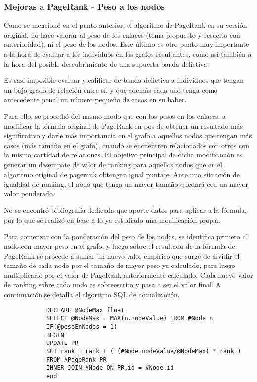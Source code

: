 \subsubsection{Mejoras a PageRank - Peso a los nodos}

Como se mencionó en el punto anterior, el algoritmo de PageRank en su versión original, no hace valorar al peso de los enlaces (tema propuesto y resuelto con anterioridad), ni el peso de los nodos. Este último es otro punto muy importante a la hora de evaluar a los individuos en los grafos resultantes, como así también a la hora del posible descubrimiento de una supuesta banda delictiva.

Es casi imposible evaluar y calificar de banda delictiva a individuos que tengan un bajo grado de relación entre sí, y que además cada uno tenga como antecedente penal un número pequeño de casos en su haber.

Para ello, se procedió del mismo modo que con los pesos en los enlaces, a modificar la fórmula original de PageRank en pos de obtener un resultado más significativo y darle más importancia en el grafo a aquellos nodos que tengan más casos (más tamaño en el grafo), cuando se encuentren relacionados con otros con la misma cantidad de relaciones. El objetivo principal de dicha modificación es generar un desempate de valor de ranking para aquellos nodos que en el algoritmo original de pagerank obtengan igual puntaje. Ante una situación de igualdad de ranking, el nodo que tenga un mayor tamaño quedará con un mayor valor ponderado.

No se encontró bibliografía dedicada que aporte datos para aplicar a la fórmula, por lo que se realizó  en base a lo ya estudiado una modificación propia. 

Para comenzar con la ponderación del peso de los nodos, se identifica primero al nodo con mayor peso en el grafo, y luego sobre el resultado de la fórmula de PageRank se procede a sumar un nuevo valor empírico que surge de dividir el tamaño de cada nodo por el tamaño de mayor peso ya calculado, para luego multiplicarlo por el valor de PageRank anteriormente calculado. Cada nuevo valor de ranking sobre cada nodo es sobreescrito y pasa a ser el valor final. A continuación se detalla el algoritmo SQL de actualización.

\begin{scriptsize}{1}
	\tiny{
		\begin{verbatim}
			DECLARE @NodeMax float
			SELECT @NodeMax = MAX(n.nodeValue) FROM #Node n			
			IF(@pesoEnNodos = 1)
			BEGIN
			UPDATE PR 
			SET rank = rank + ( (#Node.nodeValue/@NodeMax) * rank )
			FROM #PageRank PR
			INNER JOIN #Node ON PR.id = #Node.id
			end
		\end{verbatim}
	}
\end{scriptsize}


